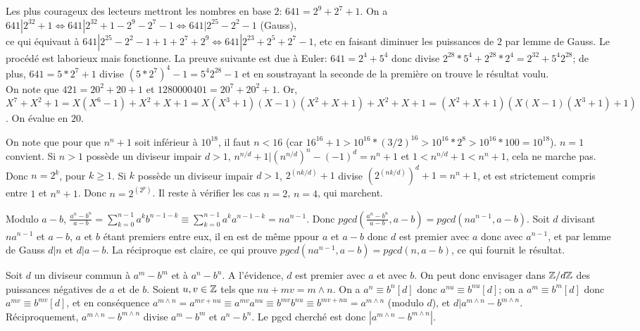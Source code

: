 \begin{sol}[10]
		Les plus courageux des lecteurs mettront les nombres en base $2$: $641=2^9+2^7+1$. 
		On a $641|2^32+1 \Leftrightarrow 641|2^32+1-2^9-2^7-1 \Leftrightarrow 641|2^25-2^2-1$ (Gauss),\\ ce qui \'equivaut \`a $641|2^25-2^2-1+1+2^7+2^9 \Leftrightarrow 641|2^23+2^5+2^7-1$, etc en faisant diminuer les puissances de $2$ par lemme de Gauss. Le proc\'ed\'e est laborieux mais fonctionne. La preuve suivante est due \`a Euler: $641=2^4+5^4$ donc divise $2^28*5^4+2^28*2^4=2^32+5^4 2^28$; de plus, $641=5*2^7+1$ divise $(5*2^7)^4-1=5^4 2^28-1$ et en soustrayant la seconde de la premi\`ere on trouve le r\'esultat voulu.\\
		On note que $421=20^2+20+1$ et $1280000401=20^7+20^2+1$. Or, \\ $X^7+X^2+1=X(X^6-1)+X^2+X+1=X(X^3+1)(X-1)(X^2+X+1)+X^2+X+1=(X^2+X+1)(X(X-1)(X^3+1)+1)$. On \'evalue en $20$. 		
\end{sol}

\begin{sol}[11]
		On note que pour que $n^n+1$ soit inf\'erieur \`a $10^{18}$, il faut $n < 16$ (car $16^{16} + 1 > 10^{16}*(3/2)^{16} > 10^{16}* 2^8 > 10^{16}*100=10^{18}$). 
		$n=1$ convient. Si $n > 1$ poss\`ede un diviseur impair $d > 1$, $n^{n/d}+1|(n^{n/d})^n-(-1)^d=n^n+1$ et $1 < n^{n/d}+1 < n^n+1$, cela ne marche pas. Donc $n=2^k$, pour $k \geq 1$. Si $k$ poss\`ede un diviseur impair $d > 1$, $2^(nk/d)+1$ divise $(2^(nk/d))^d+1=n^n+1$, et est strictement compris entre $1$ et $n^n+1$. Donc $n=2^(2^p)$. Il reste \`a v\'erifier les cas $n=2$, $n=4$, qui marchent. 
\end{sol}

\begin{sol}[12]
		Modulo $a-b$, $\frac{a^n-b^n}{a-b}=\sum \limits_{k=0}^{n-1}{a^k b^{n-1-k}} \equiv \sum \limits_{k=0}^{n-1}{a^k a^{n-1-k}}=na^{n-1}$. Donc $pgcd\left(\frac{a^n-b^n}{a-b},a-b\right)=pgcd(na^{n-1},a-b)$. Soit $d$ divisant $na^{n-1}$ et $a-b$, $a$ et $b$ \'etant premiers entre eux, il en est de m\^eme ppour $a$ et $a-b$ donc $d$ est premier avec $a$ donc avec $a^{n-1}$, et par lemme de Gauss $d|n$ et $d|a-b$. La r\'eciproque est claire, ce qui prouve $pgcd(na^{n-1},a-b)=pgcd(n,a-b)$, ce qui fournit le r\'esultat.
\end{sol}

\begin{sol}[13]
		Soit $d$ un diviseur commun \`a $a^m-b^m$ et \`a $a^n-b^n$. A l'\'evidence, $d$ est premier avec $a$ et avec $b$. On peut donc envisager dans $\mathbb Z/d\mathbb Z$ des puissances n\'egatives de $a$ et de $b$. Soient $u,v \in \mathbb Z$ tels que $nu+mv=m\wedge n$. On a $a^n \equiv b^n [d]$ donc $a^{nu} \equiv b^{nu} [d]$; on a $a^m \equiv b^m[d]$ donc $a^{mv} \equiv b^{mv}[d]$, et en cons\'equence $a^{m\wedge n}=a^{mv+nu} \equiv a^{mv}a^{nu} \equiv b^{mv}b^{nu}\equiv b^{mv+nu}=a^{m \wedge n}$ (modulo $d$), et $d | a^{m \wedge n}-b^{m\wedge n}$.\\
		R\'eciproquement, $a^{m \wedge n}-b^{m\wedge n}$ divise $a^m-b^m$ et $a^n-b^n$. Le pgcd cherch\'e est donc $|a^{m \wedge n}-b^{m \wedge n}|$.
\end{sol}


